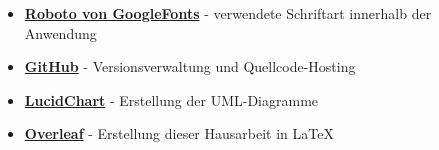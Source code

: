 \begin{itemize}
    \item \href{https://fonts.google.com/specimen/Roboto}{\textbf{Roboto von GoogleFonts}} - verwendete Schriftart innerhalb der Anwendung

    \item \href{https://www.github.com}{\textbf{GitHub}} - Versionsverwaltung und Quellcode-Hosting

     \item \href{https://www.lucidchart.com}{\textbf{LucidChart}} - Erstellung der UML-Diagramme

    \item \href{https://www.overleaf.com}{\textbf{Overleaf}} - Erstellung dieser Hausarbeit in LaTeX
\end{itemize}







